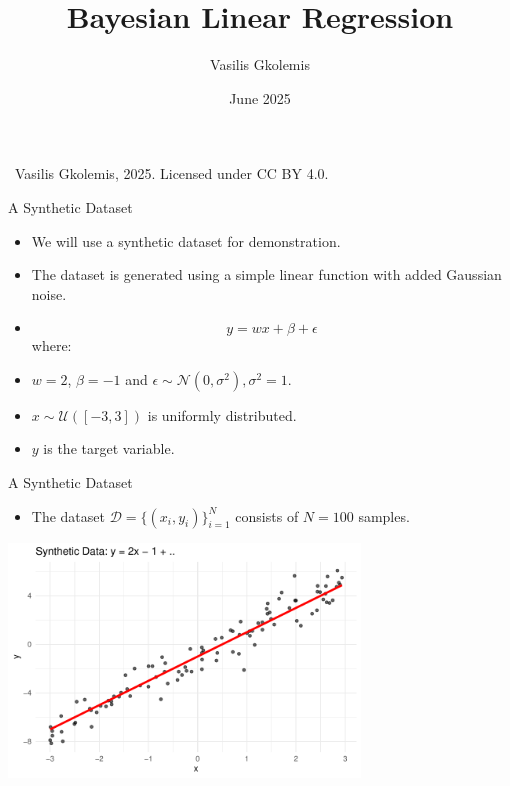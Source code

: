 \documentclass{beamer}
\title{Bayesian Linear Regression}
\author{Vasilis Gkolemis}
\institute{ATHENA RC | HUA}
\date{June 2025}
\begin{document}

\begin{frame}
  \titlepage
  \vfill
  \footnotesize
  \textcopyright\
  Vasilis Gkolemis, 2025. Licensed under CC BY 4.0.
\end{frame}

\begin{frame}{A Synthetic Dataset}
  \begin{itemize}
  \item We will use a synthetic dataset for demonstration.
  \item The dataset is generated using a simple linear function with added Gaussian noise.
  \end{itemize}
  \begin{itemize}
  \item[] \[y = wx + \beta + \epsilon\]
    where:
  \item[] $w = 2$, $\beta = -1$ and $\epsilon \sim \mathcal{N}(0, \sigma^2), \sigma^2 = 1$.
  \item[] $x \sim \mathcal{U}([-3, 3])$ is uniformly distributed.
  \item[] $y$ is the target variable.
    \end{itemize}
  \end{frame}

\begin{frame}{A Synthetic Dataset}
  \begin{itemize}
  \item The dataset $\mathcal{D} = \{(x_i, y_i)\}_{i=1}^{N}$ consists of $N = 100$ samples.
  \end{itemize}
  \begin{center}
    \includegraphics[width=0.7\textwidth]{ground_truth.pdf}
  \end{center}
  \end{frame}
\end{document}
